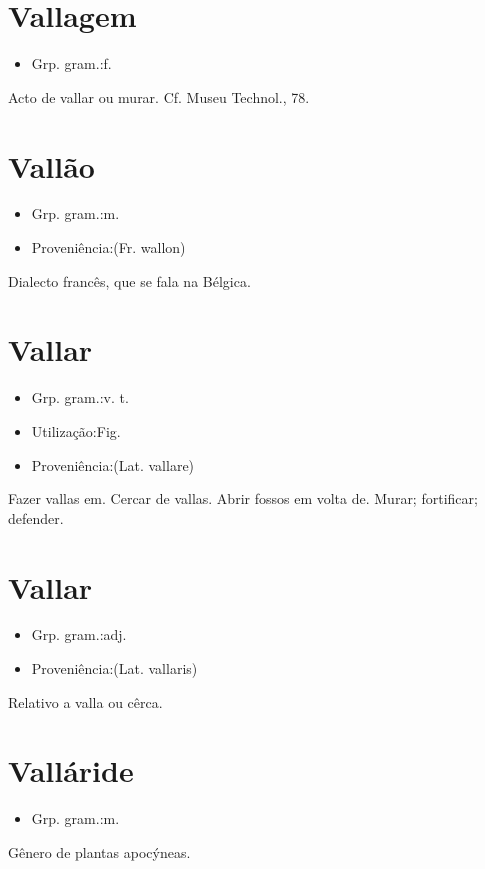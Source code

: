 \documentclass{article}
\begin{document}
\section{Vallagem}
\begin{itemize}
\item {Grp. gram.:f.}
\end{itemize}
Acto de vallar ou murar. Cf. \textunderscore Museu Technol.\textunderscore , 78.
\section{Vallão}
\begin{itemize}
\item {Grp. gram.:m.}
\end{itemize}
\begin{itemize}
\item {Proveniência:(Fr. \textunderscore wallon\textunderscore )}
\end{itemize}
Dialecto francês, que se fala na Bélgica.
\section{Vallar}
\begin{itemize}
\item {Grp. gram.:v. t.}
\end{itemize}
\begin{itemize}
\item {Utilização:Fig.}
\end{itemize}
\begin{itemize}
\item {Proveniência:(Lat. \textunderscore vallare\textunderscore )}
\end{itemize}
Fazer vallas em.
Cercar de vallas.
Abrir fossos em volta de.
Murar; fortificar; defender.
\section{Vallar}
\begin{itemize}
\item {Grp. gram.:adj.}
\end{itemize}
\begin{itemize}
\item {Proveniência:(Lat. \textunderscore vallaris\textunderscore )}
\end{itemize}
Relativo a valla ou cêrca.
\section{Valláride}
\begin{itemize}
\item {Grp. gram.:m.}
\end{itemize}
Gênero de plantas apocýneas.
\end{document}
